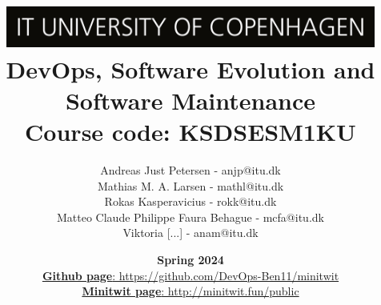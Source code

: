 \documentclass[a4paper,12pt]{article}
\title{%
\includegraphics[width=345.0pt]{ITU_logo_UK jpg.jpg}
\vspace{0.5cm}\\
{\Huge \textbf{DevOps, Software Evolution and Software Maintenance}}\\
\vspace{0.5cm}
Course code: KSDSESM1KU
}
\author{Andreas Just Petersen - anjp@itu.dk \\ Mathias M. A. Larsen - mathl@itu.dk \\ Rokas Kasperavicius - rokk@itu.dk \\ Matteo Claude Philippe Faura Behague - mcfa@itu.dk \\ Viktoria [...] - anam@itu.dk}
\date{\textbf{Spring 2024}\\
\href{https://github.com/DevOps-Ben11/minitwit}{\textbf{Github page}: https://github.com/DevOps-Ben11/minitwit}\\
\href{http://minitwit.fun/public}{\textbf{Minitwit page}: http://minitwit.fun/public}}
\begin{document}
\begin{titlingpage}
    \maketitle
\end{titlingpage}

\newpage
\tableofcontents
\newpage






\end{document}
